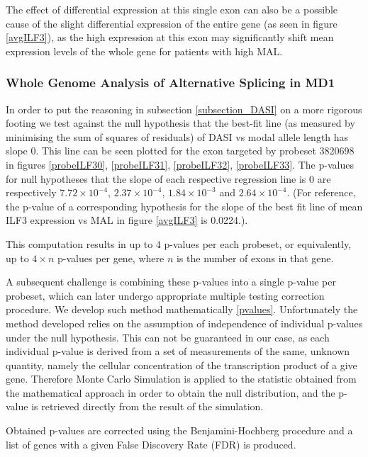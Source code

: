 The effect of differential expression at this single exon can also be a possible cause of the slight differential expression of the entire gene (as seen in figure \ref{avgILF3}), as the high expression at this exon may significantly shift mean expression levels of the whole gene for patients with high MAL.

\subsubsection{Whole Genome Analysis of Alternative Splicing in MD1} \label{section_wholegenome}

In order to put the reasoning in subsection \ref{subsection_DASI} on a more rigorous footing we test against the null hypothesis that the best-fit line (as measured by minimising the sum of squares of residuals) of DASI vs modal allele length has slope 0. This line can be seen plotted for the exon targeted by probeset 3820698 in figures \ref{probeILF30}, \ref{probeILF31}, \ref{probeILF32}, \ref{probeILF33}. The p-values for null hypotheses that the slope of each respective regression line is 0 are respectively $7.72×10^{-4}$, $2.37×10^{-4}$, $1.84 × 10^{-3}$ and $2.64 × 10 ^{-4}$. (For reference, the p-value of a corresponding hypothesis for the slope of the best fit line of mean ILF3 expression vs MAL in figure \ref{avgILF3} is 0.0224.).

This computation results in up to $4$ p-values per each probeset, or equivalently, up to $4×n$ p-values per gene, where $n$ is the number of exons in that gene.

A subsequent challenge is combining these p-values into a single p-value per probeset, which can later undergo appropriate multiple testing correction procedure. We develop such method mathematically \ref{pvalues}. Unfortunately the method developed relies on the assumption of independence of individual p-values under the null hypothesis. This can not be guaranteed in our case, as each individual p-value is derived from a set of measurements of the same, unknown quantity, namely the cellular concentration of the transcription product of a give gene. Therefore Monte Carlo Simulation is applied to the statistic obtained from the mathematical approach in order to obtain the null distribution, and the p-value is retrieved directly from the result of the simulation.

Obtained p-values are corrected using the Benjamini-Hochberg procedure \parencite{Benjamini1995} and a list of genes with a given False Discovery Rate (FDR) is produced.

